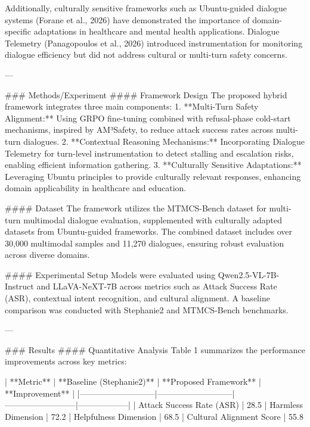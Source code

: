 Additionally, culturally sensitive frameworks such as Ubuntu-guided dialogue systems (Forane et al., 2026) have demonstrated the importance of domain-specific adaptations in healthcare and mental health applications. Dialogue Telemetry (Panagopoulos et al., 2026) introduced instrumentation for monitoring dialogue efficiency but did not address cultural or multi-turn safety concerns.  

---

### Methods/Experiment  
#### Framework Design  
The proposed hybrid framework integrates three main components:  
1. **Multi-Turn Safety Alignment:** Using GRPO fine-tuning combined with refusal-phase cold-start mechanisms, inspired by AM³Safety, to reduce attack success rates across multi-turn dialogues.  
2. **Contextual Reasoning Mechanisms:** Incorporating Dialogue Telemetry for turn-level instrumentation to detect stalling and escalation risks, enabling efficient information gathering.  
3. **Culturally Sensitive Adaptations:** Leveraging Ubuntu principles to provide culturally relevant responses, enhancing domain applicability in healthcare and education.  

#### Dataset  
The framework utilizes the MTMCS-Bench dataset for multi-turn multimodal dialogue evaluation, supplemented with culturally adapted datasets from Ubuntu-guided frameworks. The combined dataset includes over 30,000 multimodal samples and 11,270 dialogues, ensuring robust evaluation across diverse domains.  

#### Experimental Setup  
Models were evaluated using Qwen2.5-VL-7B-Instruct and LLaVA-NeXT-7B across metrics such as Attack Success Rate (ASR), contextual intent recognition, and cultural alignment. A baseline comparison was conducted with Stephanie2 and MTMCS-Bench benchmarks.  

---

### Results  
#### Quantitative Analysis  
Table 1 summarizes the performance improvements across key metrics:  

| **Metric**                | **Baseline (Stephanie2)** | **Proposed Framework** | **Improvement** |  
|---------------------------|---------------------------|--------------------------|------------------|  
| Attack Success Rate (ASR) | 28.5%
| Harmless Dimension        | 72.2%
| Helpfulness Dimension     | 68.5%
| Cultural Alignment Score  | 55.8%

